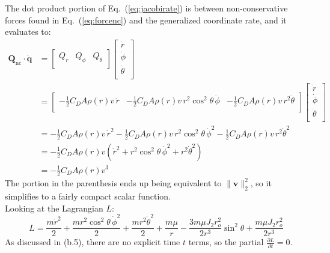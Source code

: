 \documentclass[titlepage]{article}
\begin{document}
The dot product portion of Eq.~(\ref{eq:jacobirate}) is between non-conservative forces found in Eq.~(\ref{eq:forcenc}) and the generalized coordinate rate, and it evaluates to:
\begin{equation}
	\begin{split}
		\boldsymbol{Q}_{\text{nc}}\cdot\dot{\boldsymbol{q}}&=
		\begin{bmatrix}
			Q_r & Q_\phi & Q_\theta \\
		\end{bmatrix}
		\begin{bmatrix}
			\dot{r} \\
			\dot{\phi} \\
			\dot{\theta} \\
		\end{bmatrix} \\
		&=
		\begin{bmatrix}
			-\frac{1}{2}C_DA\rho(r)v\,\dot{r} & -\frac{1}{2}C_DA\rho(r)v\,r^2\cos^2\theta\,\dot{\phi} & -\frac{1}{2}C_DA\rho(r)v\,r^2\dot{\theta} \\
		\end{bmatrix}
		\begin{bmatrix}
			\dot{r} \\
			\dot{\phi} \\
			\dot{\theta} \\
		\end{bmatrix} \\
		&=-\frac{1}{2}C_DA\rho(r)v\,\dot{r}^2-\frac{1}{2}C_DA\rho(r)v\,r^2\cos^2\theta\,\dot{\phi}^2-\frac{1}{2}C_DA\rho(r)v\,r^2\dot{\theta}^2 \\
		&=-\frac{1}{2}C_DA\rho(r)v\left(\dot{r}^2+r^2\cos^2\theta\,\dot{\phi}^2+r^2\dot{\theta}^2\right) \\
		&=-\frac{1}{2}C_DA\rho(r)v^3
	\end{split}
\end{equation}
The portion in the parenthesis ends up being equivalent to $\|\boldsymbol{v}\|_2^2$, so it simplifies to a fairly compact scalar function.\\

Looking at the Lagrangian $L$:
\begin{equation}
	L=\frac{m\dot{r}^2}{2}+\frac{mr^2\cos^2\theta\,\dot{\phi}^2}{2}+\frac{mr^2\dot{\theta}^2}{2}+\frac{m\mu}{r}-\frac{3m\mu J_2r_o^2}{2r^3}\sin^2\theta+\frac{m\mu J_2r_o^2}{2r^3}
\end{equation}
As discussed in (b.5), there are no explicit time $t$ terms, so the partial $\frac{\partial L}{\partial t}=0$.\\
\end{document}
